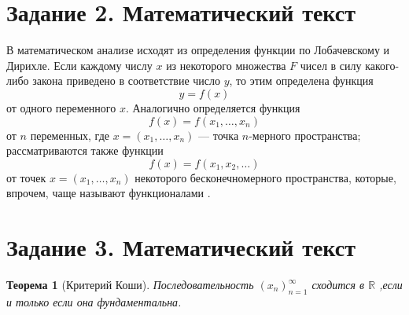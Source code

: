 \documentclass[a4paper,12pt]{article}
\begin{document}
\section*{Задание 2. Математический текст}
В математическом анализе исходят из определения функции по Лобачевскому и Дирихле. Если каждому числу $x$ из некоторого множества $F$ чисел в силу какого-либо закона приведено в соответствие число $y$, то этим определена функция \[y=f(x)\] от одного переменного $x$. Аналогично определяется функция \[f(x)=f(x_1,\ldots,x_n)\] от $n$ переменных, где $x=(x_1,\ldots,x_n)$ --- точка $n$-мерного пространства; рассматриваются также функции \[f(x)=f(x_1,x_2,\ldots)\] от точек $x=(x_1,\ldots,x_n)$ некоторого бесконечномерного пространства, которые, впрочем, чаще называют функционалами \cite{Vinogradov}.
\section*{Задание 3. Математический текст}
\newtheorem{theorem}{Теорема}[section]\begin{theorem}[Критерий Коши]Последовательность $(x_n)^\infty_{n=1}$ сходится в $\mathbb{R}$ ,если и только если она фундаментальна.\end{theorem}
\end{document}

